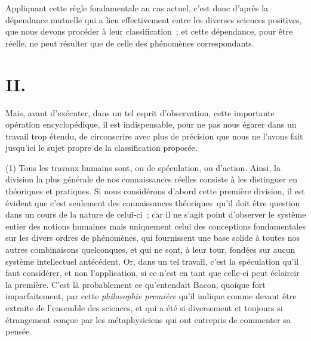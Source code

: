\documentclass[french,twoside]{book} %
\begin{document}
Appliquant cette règle fondamentale au cas actuel, c’est donc d’après la dépendance mutuelle qui a lieu effectivement entre les diverses sciences positives, que nous devons procéder à leur classification ; et cette dépendance, pour être réelle, ne peut résulter que de celle des phénomènes correspondants.
\section[{II.}]{II.}
\noindent Mais, avant d’exécuter, dans un tel esprit d’observation, cette importante opération encyclopédique, il est indispensable, pour ne pas nous égarer dans un travail trop étendu, de circonscrire avec plus de précision que nous ne l’avons fait jusqu’ici le sujet propre de la classification proposée.\par
(1) Tous les travaux humains sont, ou de spéculation, ou d’action. Ainsi, la division la plus générale de nos connaissances réelles consiste à les distinguer en théoriques et pratiques. Si nous considérons d’abord cette première division, il est évident que c’est seulement des connaissances théoriques qu’il doit être question dans un cours de la nature de celui-ci ; car il ne s’agit point d’observer le système entier des notions humaines mais uniquement celui des conceptions fondamentales sur les divers ordres de phénomènes, qui fournissent une base solide à toutes nos autres combinaisons quelconques, et qui ne sont, à leur tour, fondées sur aucun système intellectuel antécédent. Or, dans un tel travail, c’est la spéculation qu’il faut considérer, et non l’application, si ce n’est en tant que celle-ci peut éclaircir la première. C’est là probablement ce qu’entendait Bacon, quoique fort imparfaitement, par cette {\itshape philosophie première} qu’il indique comme devant être extraite de l’ensemble des sciences, et qui a été si diversement et toujours si étrangement conçue par les métaphysiciens qui ont entrepris de commenter sa pensée.\par
\end{document}
